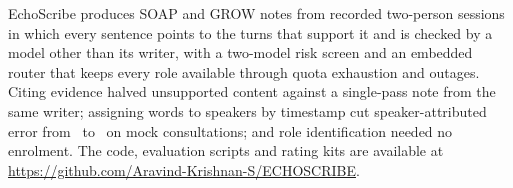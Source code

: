 EchoScribe produces SOAP and GROW notes from recorded two-person sessions in which every sentence points to the turns that support it and is checked by a model other than its writer, with a two-model risk screen and an embedded router that keeps every role available through quota exhaustion and outages. Citing evidence halved unsupported content against a single-pass note from the same writer; assigning words to speakers by timestamp cut speaker-attributed error from \ResPmCpDuration\ to \ResPmCpWords\ on mock consultations; and role identification needed no enrolment. The code, evaluation scripts and rating kits are available at \url{https://github.com/Aravind-Krishnan-S/ECHOSCRIBE}.
